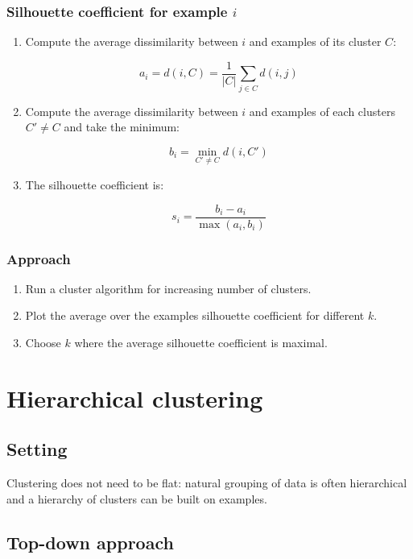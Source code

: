 		\subsubsection{Silhouette coefficient for example $i$}

		\begin{enumerate}
			\item Compute the average dissimilarity between $i$ and examples of its cluster $C$:

				$$a_i = d(i,C) = \frac{1}{|C|}\sum\limits_{j\in C}d(i,j)$$

			\item Compute the average dissimilarity between $i$ and examples of each clusters $C'\neq C$ and take the minimum:

				$$b_i = \min\limits_{C'\neq C}d(i,C')$$

			\item The silhouette coefficient is:

				$$s_i = \frac{b_i-a_i}{\max(a_i, b_i)}$$

		\end{enumerate}

		\subsubsection{Approach}

		\begin{enumerate}
			\item Run a cluster algorithm for increasing number of clusters.
			\item Plot the average over the examples silhouette coefficient for different $k$.
			\item Choose $k$ where the average silhouette coefficient is maximal.
		\end{enumerate}

\section{Hierarchical clustering}

	\subsection{Setting}
	Clustering does not need to be flat: natural grouping of data is often hierarchical and a hierarchy of clusters can be built on examples.

	\subsection{Top-down approach}

